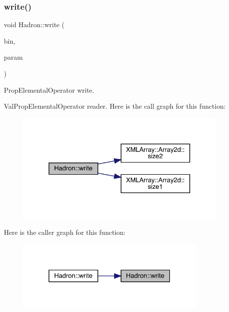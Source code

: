 \subsubsection{\texorpdfstring{write()}{write()}\hspace{0.1cm}{\footnotesize\ttfamily [68/95]}}
{\footnotesize\ttfamily void Hadron\+::write (\begin{DoxyParamCaption}\item[{\mbox{\hyperlink{classADATIO_1_1BinaryWriter}{Binary\+Writer}} \&}]{bin,  }\item[{const \mbox{\hyperlink{structHadron_1_1ValPropElementalOperator__t}{Val\+Prop\+Elemental\+Operator\+\_\+t}} \&}]{param }\end{DoxyParamCaption})}



Prop\+Elemental\+Operator write. 

Val\+Prop\+Elemental\+Operator reader. Here is the call graph for this function\+:\nopagebreak
\begin{figure}[H]
\begin{center}
\leavevmode
\includegraphics[width=298pt]{d1/daf/namespaceHadron_a4e777dd6c1ccf60b80a383fd5901627b_cgraph}
\end{center}
\end{figure}
Here is the caller graph for this function\+:\nopagebreak
\begin{figure}[H]
\begin{center}
\leavevmode
\includegraphics[width=267pt]{d1/daf/namespaceHadron_a4e777dd6c1ccf60b80a383fd5901627b_icgraph}
\end{center}
\end{figure}
\mbox{\label{namespaceHadron_a78737ee2e9f7f708d926ec9f531c8f61}} 

